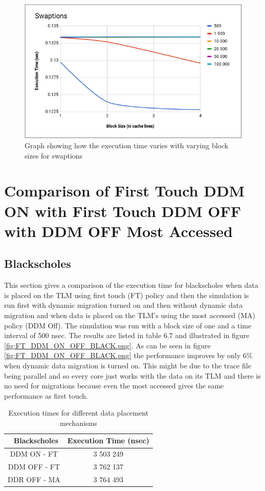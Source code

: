\documentclass{listhesis}
\begin{document}
\begin{figure}
  \includegraphics[width=\linewidth]{Swap_var_bs_fordiff_t.png}
  \centering
  \caption{Graph showing how the execution time varies with varying block sizes for swaptions}
  \label{fig:Swap_var_bs_fordiff_t.png}
\end{figure}


\section{Comparison of First Touch DDM ON with First Touch DDM OFF with DDM OFF Most Accessed}
\subsection{Blackscholes}
This section gives a comparison of the execution time for blackscholes when data is placed on the TLM using first touch (FT) policy and then the simulation is run first with dynamic migration turned on and then without dynamic data migration and when data is placed on the TLM's using the most accessed (MA) policy (DDM Off). The simulation was run with a block size of one and a time interval of 500 nsec. The results are listed in table 6.7 and illustrated in figure \ref{fig:FT_DDM_ON_OFF_BLACK.png}. As can be seen in figure \ref{fig:FT_DDM_ON_OFF_BLACK.png} the performance improves by only 6\% when dynamic data migration is turned on. This might be due to the trace file being parallel and so every core just works with the data on its TLM and there is no need for migrations because even the most accessed gives the same performance as first touch.\\

\begin{table}[h!]
\begin{center}
 \begin{tabular}{|| c | c ||} 
 \hline
 \ \textbf{Blackscholes}  & \textbf{Execution Time (nsec)}\\ [0.5 ex] 
 \hline\hline
   DDM ON - FT & 3 503 249 \\ 
 \hline
   DDM OFF - FT & 3 762 137 \\
 \hline
   DDR OFF - MA & 3 764 493 \\
 \hline
\end{tabular}
 \caption{Execution times for different data placement mechanisms}
 \label{table:ExecTimes4}
\end{center}
\end{table}
\end{document}
